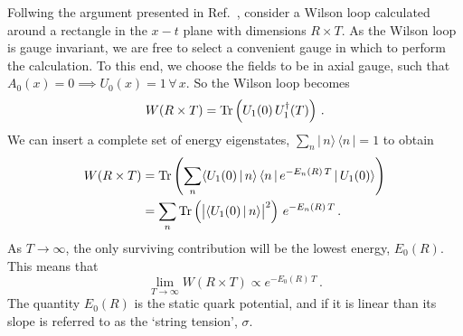 Follwing the argument presented in Ref.~\cite{Makeenko:2009dw}, consider a Wilson loop calculated around a rectangle in the $x-t$ plane with dimensions $R\times T$. As the Wilson loop is gauge invariant, we are free to select a convenient gauge in which to perform the calculation. To this end, we choose the fields to be in axial gauge, such that $A_0(x)=0\implies U_0(x) = 1\,\forall\,x$. So the Wilson loop becomes
%
\begin{equation}
W(R\times T) = \operatorname{Tr} \left(U_1(0)\,U_1^\dagger(T)\right)\, .
\end{equation}
%
We can insert a complete set of energy eigenstates, $\sum_n |\,n\rangle\,\langle n \,|=1$ to obtain
%
\begin{align*}
W(R\times T) &= \operatorname{Tr} \left( \sum_n \langle U_1(0)\, |\, n\rangle\,\langle n\, |\, e^{-E_n(R)\, T}\, | \, U_1(0) \rangle\right)\\
&=  \sum_n \operatorname{Tr} \left( \big|\langle U_1(0)\, |\, n\rangle\big|^2 \right)\,e^{-E_n(R)\,T} \, .
\end{align*}
%
As $T\rightarrow \infty$, the only surviving contribution will be the lowest energy, $E_0(R)$. This means that
%
\begin{equation}
\lim_{T\rightarrow \infty} W(R\times T) \propto e^{-E_0(R)\, T}\, .
\label{eq:WilsonEnergy}
\end{equation}
The quantity $E_0(R)$ is the static quark potential, and if it is linear than its slope is referred to as the `string tension', $\sigma$.
\\

